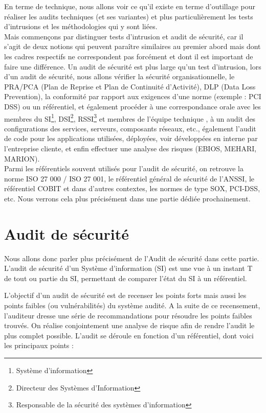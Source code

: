 \documentclass[a4paper]{memoir}
\begin{document}
En terme de technique, nous allons voir ce qu'il existe en terme d'outillage pour réaliser les audits techniques (et ses variantes) et plus particulièrement les tests d'intrusions et les méthodologies qui y sont liées.\\
Mais commençons par distinguer tests d'intrusion et audit de sécurité, car il s'agit de deux notions qui peuvent paraître similaires au premier abord mais dont les cadres respectifs ne correspondent pas forcément et dont il est important de faire une différence. 
Un audit de sécurité est plus large qu'un test d'intrusion, lors d'un audit de sécurité, nous allons vérifier la sécurité organisationnelle, le PRA/PCA (Plan de Reprise et Plan de Continuité d'Activité), DLP (Data Loss Prevention), la conformité par rapport aux exigences d'une norme (exemple : PCI DSS) ou un référentiel, et également procéder à une correspondance orale avec les membres du SI\footnote{Système d'information}, DSI\footnote{Directeur des Systèmes d'Information}, RSSI\footnote{Responsable de la sécurité des systèmes d'information} et membres de l’équipe technique , à un audit des configurations des services, serveurs, composants réseaux, etc., également l’audit de code pour les applications utilisées, déployées, voir développées en interne par l’entreprise cliente, et enfin effectuer une analyse des risques (EBIOS, MEHARI, MARION).\\ 

Parmi les référentiels souvent utilisés pour l’audit de sécurité, on retrouve la norme ISO 27 000 / ISO 27 001, le référentiel général de sécurité de l’ANSSI, le référentiel COBIT et dans d’autres contextes, les normes de type SOX, PCI-DSS, etc. Nous verrons cela plus précisément dans une partie dédiée prochainement.

\chapter{Audit de sécurité}

Nous allons donc parler plus précisément de l'Audit de sécurité dans cette partie. L'audit de sécurité d'un Système d'information (SI) est une vue à un instant T de tout ou partie du SI, permettant de comparer l'état du SI à un référentiel.

L'objectif d'un audit de sécurité est de recenser les points forts mais aussi les points faibles (ou vulnérabilités) du système audité. A la suite de ce recensement, l'auditeur dresse une série de recommandations pour résoudre les points faibles trouvés. On réalise conjointement une analyse de risque afin de rendre l'audit le plus complet possible.
L'audit se déroule en fonction d'un référentiel, dont voici les principaux points :
\end{document}
